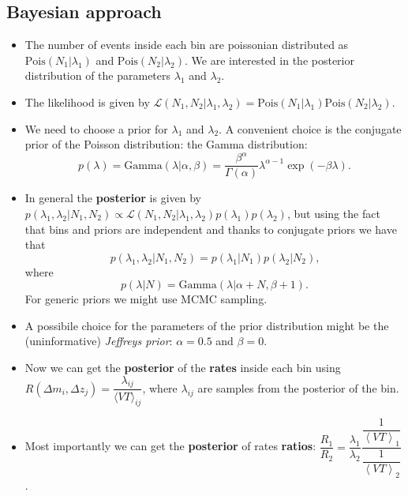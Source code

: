 \documentclass[12pt,a4paper]{article}
\begin{document}
\subsection{Bayesian approach}
\begin{itemize}
    \item The number of events inside each bin are poissonian distributed as \(\mathrm{Pois}(N_1 | \lambda_1)\) and \(\mathrm{Pois}(N_2 | \lambda_2)\). We are interested in the posterior distribution of the parameters \(\lambda_1\) and \(\lambda_2\).
    \item The likelihood is given by \(\mathcal{L}(N_1, N_2 | \lambda_1, \lambda_2) = \mathrm{Pois}(N_1 | \lambda_1) \mathrm{Pois}(N_2 | \lambda_2)\).
    \item We need to choose a prior for $\lambda_1$ and $\lambda_2$. A convenient choice is the conjugate prior of the Poisson distribution: the Gamma distribution: \begin{equation} \label{eq:Gamma_dist}
        p(\lambda) = \mathrm{Gamma}(\lambda | \alpha, \beta) = \dfrac{\beta^\alpha}{\Gamma(\alpha)} \lambda^{\alpha-1} \exp(-\beta\lambda) \text{.}
    \end{equation}
    \item In general the \textbf{posterior} is given by \(p(\lambda_1, \lambda_2 | N_1, N_2) \propto \mathcal{L}(N_1, N_2 | \lambda_1, \lambda_2) p(\lambda_1) p(\lambda_2)\), but using the fact that bins and priors are independent and thanks to conjugate priors we have that \begin{equation} \label{eq:joint_posterior}
        p(\lambda_1, \lambda_2 | N_1, N_2) = p(\lambda_1 | N_1) p(\lambda_2 | N_2) \text{,}
    \end{equation} where \begin{equation} \label{eq:posterior_lambda}
    p(\lambda | N) = \mathrm{Gamma}(\lambda | \alpha + N, \beta + 1) \text{.}
    \end{equation}
    For generic priors we might use MCMC sampling.
    \item A possibile choice for the parameters of the prior distribution might be the (uninformative) \textit{Jeffreys prior}: \(\alpha = 0.5\) and \(\beta = 0\).
    \item Now we can get the \textbf{posterior} of the \textbf{rates} inside each bin using \(R(\Delta m_i, \Delta z_j) = \dfrac{\lambda_{ij}}{\langle VT \rangle_{ij}}\), where $\lambda_{ij}$ are samples from the posterior of the bin.
    \item Most importantly we can get the \textbf{posterior} of rates \textbf{ratios}: \(\dfrac{R_1}{R_2} = \dfrac{\lambda_1}{\lambda_2}\dfrac{\dfrac{1}{\left\langle VT \right\rangle_1}}{\dfrac{1}{\left\langle VT \right\rangle_2}}\).
\end{itemize}
\end{document}
